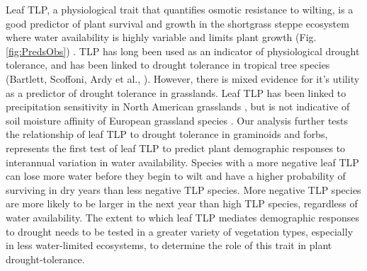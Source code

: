 \documentclass[12pt, letterpaper]{article}
\begin{document}
Leaf TLP, a physiological trait that quantifies osmotic resistance to wilting, is a good predictor of plant survival and growth in the shortgrass steppe ecosystem where water availability is highly variable and limits plant growth (Fig. \ref{fig:PredsObs}) \cite{Lauenroth1992Long-TermSteppe}. TLP has long been used as an indicator of physiological drought tolerance, and has been linked to drought tolerance in tropical tree species (Bartlett, Scoffoni, Ardy et al., ). However, there is mixed evidence for it’s utility as a predictor of drought tolerance in grasslands. Leaf TLP has been linked to precipitation sensitivity in North American grasslands \cite{Griffin-Nolan2019, Blumenthal2020, Wilcox2020PlantPrairie}, but is not indicative of soil moisture affinity of European grassland species . Our analysis further tests the relationship of leaf TLP to drought tolerance in graminoids and forbs, represents the first test of leaf TLP to predict plant demographic responses to interannual variation in water availability. Species with a more negative leaf TLP can lose more water before they begin to wilt and have a higher probability of surviving in dry years than less negative TLP species. More negative TLP species are more likely to be larger in the next year than high TLP species, regardless of water availability. The extent to which leaf TLP mediates demographic responses to drought needs to be tested in a greater variety of vegetation types, especially in less water-limited ecosystems, to determine the role of this trait in plant drought-tolerance.
\end{document}
